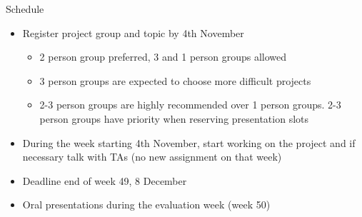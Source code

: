 \documentclass[t]{beamer}
\begin{document}
\begin{frame}
  
  {\Large\color{navyblue} Schedule}


  \begin{itemize}
  \item Register project group and topic by 4th November
    \begin{itemize}
    \item 2 person group preferred, 3 and 1 person groups allowed
    \item 3 person groups are expected to choose more difficult projects
	\item 2-3 person groups are highly recommended over 1 person groups. 2-3 person groups have priority when reserving presentation slots
    \end{itemize}
  \item During the week starting 4th November, start working on the
    project and if necessary talk with TAs (no new assignment on that
    week)
  \item Deadline end of week 49, 8 December
  \item Oral presentations during the evaluation week (week 50)
  \end{itemize}
  
\end{frame}
\end{document}
